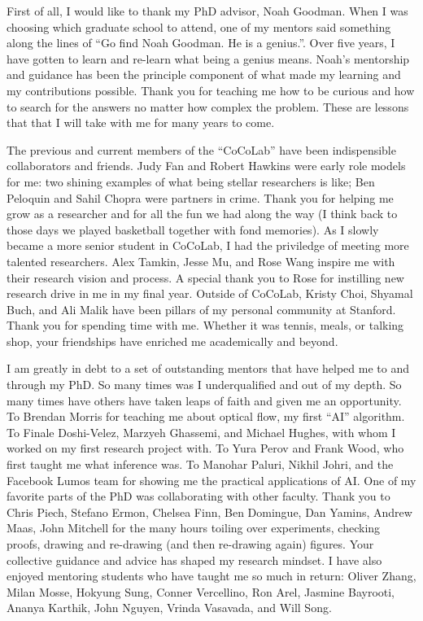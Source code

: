 First of all, I would like to thank my PhD advisor, Noah Goodman. When I was choosing which graduate school to attend, one of my mentors said something along the lines of ``Go find Noah Goodman. He is a genius.''. Over five years, I have gotten to learn and re-learn what being a genius means. Noah's mentorship and guidance has been the principle component of what made my learning and my contributions possible. Thank you for teaching me how to be curious and how to search for the answers no matter how complex the problem. These are lessons that that I will take with me for many years to come.

The previous and current members of the ``CoCoLab'' have been indispensible collaborators and friends. Judy Fan and Robert Hawkins were early role models for me: two shining examples of what being stellar researchers is like; Ben Peloquin and Sahil Chopra were partners in crime. Thank you for helping me grow as a researcher and for all the fun we had along the way (I think back to those days we played basketball together with fond memories). As I slowly became a more senior student in CoCoLab, I had the priviledge of meeting more talented researchers. Alex Tamkin, Jesse Mu, and Rose Wang inspire me with their research vision and process. A special thank you to Rose for instilling new research drive in me in my final year. Outside of CoCoLab, Kristy Choi, Shyamal Buch, and Ali Malik have been pillars of my personal community at Stanford. Thank you for spending time with me. Whether it was tennis, meals, or talking shop, your friendships have enriched me academically and beyond.

I am greatly in debt to a set of outstanding mentors that have helped me to and through my PhD. So many times was I underqualified and out of my depth. So many times have others have taken leaps of faith and given me an opportunity. To Brendan Morris for teaching me about optical flow, my first ``AI'' algorithm. To Finale Doshi-Velez, Marzyeh Ghassemi, and Michael Hughes, with whom I worked on my first research project with. To Yura Perov and Frank Wood, who first taught me what inference was. To Manohar Paluri, Nikhil Johri, and the Facebook Lumos team for showing me the practical applications of AI. One of my favorite parts of the PhD was collaborating with other faculty. Thank you to Chris Piech, Stefano Ermon, Chelsea Finn, Ben Domingue, Dan Yamins, Andrew Maas, John Mitchell for the many hours toiling over experiments, checking proofs, drawing and re-drawing (and then re-drawing again) figures. Your collective guidance and advice has shaped my research mindset. I have also enjoyed mentoring students who have taught me so much in return: Oliver Zhang, Milan Mosse, Hokyung Sung, Conner Vercellino, Ron Arel, Jasmine Bayrooti, Ananya Karthik, John Nguyen, Vrinda Vasavada, and Will Song.

